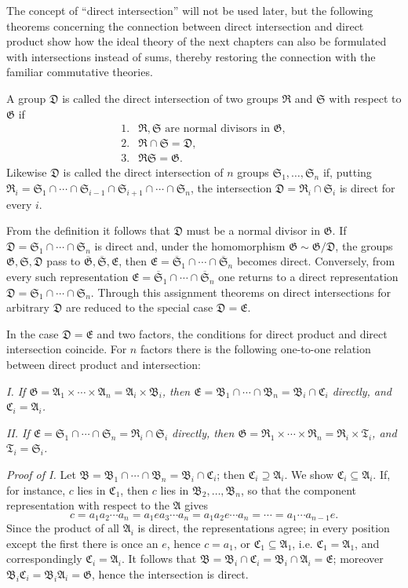 \documentclass[11pt]{article}
\providecommand{\mG}{\mathfrak{G}}
\providecommand{\mA}{\mathfrak{A}}
\providecommand{\mB}{\mathfrak{B}}
\providecommand{\mC}{\mathfrak{C}}
\providecommand{\mD}{\mathfrak{D}}
\providecommand{\mE}{\mathfrak{E}}
\providecommand{\mR}{\mathfrak{R}}
\providecommand{\mS}{\mathfrak{S}}
\providecommand{\mT}{\mathfrak{T}}
\begin{document}
The concept of ``direct intersection'' will not be used later, but the following theorems concerning the connection between direct intersection and direct product show how the ideal theory of the next chapters can also be formulated with intersections instead of sums, thereby restoring the connection with the familiar commutative theories.

A group $\mD$ is called the direct intersection of two groups $\mR$ and $\mS$ with respect to $\mG$ if
\[
\begin{array}{ll}
1.& \mR,\mS\text{ are normal divisors in }\mG,\\
2.& \mR\cap\mS=\mD,\\
3.& \mR\mS=\mG.
\end{array}
\]
Likewise $\mD$ is called the direct intersection of $n$ groups $\mS_1,\ldots,\mS_n$ if, putting $\mR_i=\mS_1\cap\cdots\cap\mS_{i-1}\cap\mS_{i+1}\cap\cdots\cap\mS_n$, the intersection $\mD=\mR_i\cap\mS_i$ is direct for every $i$.

From the definition it follows that $\mD$ must be a normal divisor in $\mG$. If $\mD=\mS_1\cap\cdots\cap\mS_n$ is direct and, under the homomorphism $\mG\sim\mG/\mD$, the groups $\mG,\mS,\mD$ pass to $\overline{\mG},\overline{\mS},\mE$, then $\mE=\overline{\mS}_1\cap\cdots\cap\overline{\mS}_n$ becomes direct. Conversely, from every such representation $\mE=\overline{\mS}_1\cap\cdots\cap\overline{\mS}_n$ one returns to a direct representation $\mD=\mS_1\cap\cdots\cap\mS_n$. Through this assignment theorems on direct intersections for arbitrary $\mD$ are reduced to the special case $\mD=\mE$.

In the case $\mD=\mE$ and two factors, the conditions for direct product and direct intersection coincide. For $n$ factors there is the following one-to-one relation between direct product and intersection:

\emph{I. If $\mG=\mA_1\times\cdots\times\mA_n=\mA_i\times\mB_i$, then $\mE=\mB_1\cap\cdots\cap\mB_n=\mB_i\cap\mC_i$ directly, and $\mC_i=\mA_i$.}

\emph{II. If $\mE=\mS_1\cap\cdots\cap\mS_n=\mR_i\cap\mS_i$ directly, then $\mG=\mR_1\times\cdots\times\mR_n=\mR_i\times\mT_i$, and $\mT_i=\mS_i$.}

\emph{Proof of I.} Let $\mB=\mB_1\cap\cdots\cap\mB_n=\mB_i\cap\mC_i$; then $\mC_i\supseteq\mA_i$. We show $\mC_i\subseteq\mA_i$. If, for instance, $c$ lies in $\mC_1$, then $c$ lies in $\mB_2,\ldots,\mB_n$, so that the component representation with respect to the $\mA$ gives
\[
        c=a_1a_2\cdots a_n=a_1ea_3\cdots a_n=a_1a_2e\cdots a_n=\cdots=a_1\cdots a_{n-1}e.
\]
Since the product of all $\mA_i$ is direct, the representations agree; in every position except the first there is once an $e$, hence $c=a_1$, or $\mC_1\subseteq\mA_1$, i.e. $\mC_1=\mA_1$, and correspondingly $\mC_i=\mA_i$. It follows that $\mB=\mB_i\cap\mC_i=\mB_i\cap\mA_i=\mE$; moreover $\mB_i\mC_i=\mB_i\mA_i=\mG$, hence the intersection is direct.
\end{document}
